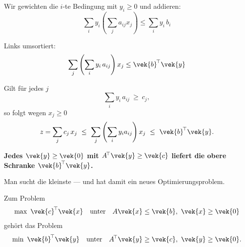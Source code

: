 \begin{merksatz}
Wir gewichten die $i$-te Bedingung mit $y_i \ge 0$ und addieren:
\[ \sum_i y_i\left(\sum_j a_{ij}x_j\right) \le \sum_i y_i\,b_i \]

Links umsortiert:
\[ \sum_j \left(\sum_i y_i\,a_{ij}\right)x_j \le \vek{b}^{\!\top}\vek{y} \]

Gilt für jedes $j$
\[ \sum_i y_i\,a_{ij} \ \ge\ c_j , \]
so folgt wegen $x_j \ge 0$
\[ z = \sum_j c_j\,x_j \ \le\ \sum_j\left(\sum_i y_i a_{ij}\right)x_j \ \le\ \vek{b}^{\!\top}\vek{y} . \]

\begin{center}
\begin{minipage}{0.9\textwidth}
\textbf{Jedes $\vek{y} \ge \vek{0}$ mit $A^{\!\top}\vek{y} \ge \vek{c}$ liefert die obere Schranke $\vek{b}^{\!\top}\vek{y}$.}
\end{minipage}
\end{center}

Man sucht die kleinste --- und hat damit ein neues Optimierungsproblem.
\end{merksatz}

\begin{definition}
Zum  Problem
\[ \max\ \vek{c}^{\!\top}\vek{x} \quad\text{unter}\quad A\vek{x}\le\vek{b},\ \vek{x}\ge\vek{0} \]
gehört das  Problem
\[ \min\ \vek{b}^{\!\top}\vek{y} \quad\text{unter}\quad A^{\!\top}\vek{y}\ge\vek{c},\ \vek{y}\ge\vek{0} . \]
\end{definition}

